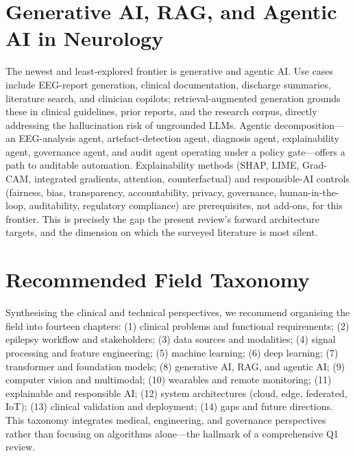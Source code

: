 \section{Generative AI, RAG, and Agentic AI in Neurology}
The newest and least-explored frontier is generative and agentic AI. Use cases include EEG-report generation, clinical documentation, discharge summaries, literature search, and clinician copilots; retrieval-augmented generation grounds these in clinical guidelines, prior reports, and the research corpus, directly addressing the hallucination risk of ungrounded LLMs. Agentic decomposition---an EEG-analysis agent, artefact-detection agent, diagnosis agent, explainability agent, governance agent, and audit agent operating under a policy gate---offers a path to auditable automation. Explainability methods (SHAP, LIME, Grad-CAM, integrated gradients, attention, counterfactual) \citep{gabeff21,raab22,vieira23,rathod22,mansour20,patil26,zhao23,ijaz24} and responsible-AI controls (fairness, bias, transparency, accountability, privacy, governance, human-in-the-loop, auditability, regulatory compliance) are prerequisites, not add-ons, for this frontier. This is precisely the gap the present review's forward architecture targets, and the dimension on which the surveyed literature is most silent.

\section{Recommended Field Taxonomy}
Synthesising the clinical and technical perspectives, we recommend organising the field into fourteen chapters: (1) clinical problems and functional requirements; (2) epilepsy workflow and stakeholders; (3) data sources and modalities; (4) signal processing and feature engineering; (5) machine learning; (6) deep learning; (7) transformer and foundation models; (8) generative AI, RAG, and agentic AI; (9) computer vision and multimodal; (10) wearables and remote monitoring; (11) explainable and responsible AI; (12) system architectures (cloud, edge, federated, IoT); (13) clinical validation and deployment; (14) gaps and future directions. This taxonomy integrates medical, engineering, and governance perspectives rather than focusing on algorithms alone---the hallmark of a comprehensive Q1 review.
